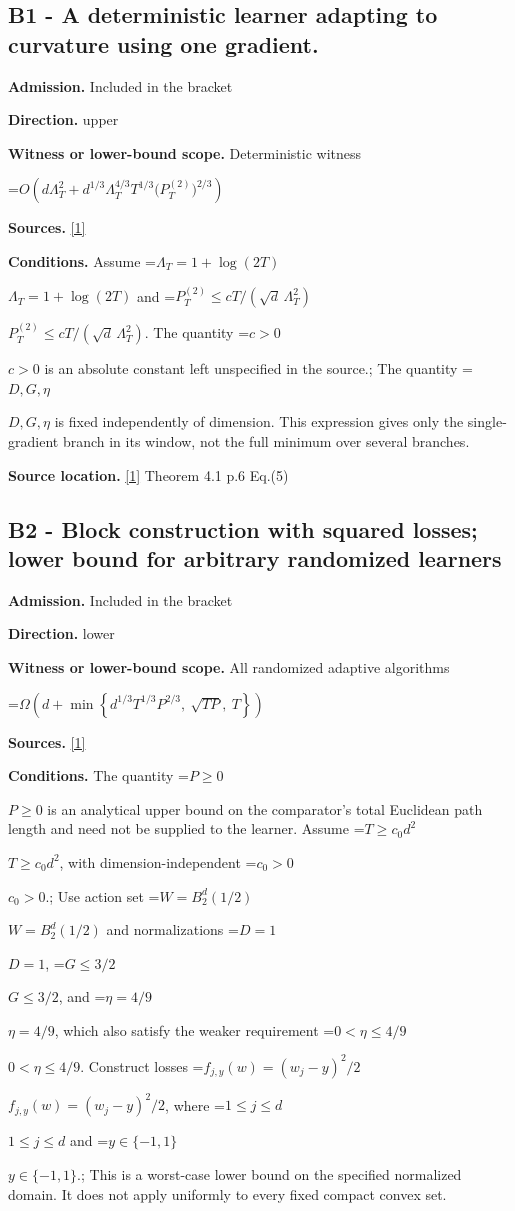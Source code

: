 \documentclass[10pt,a4paper]{article}
\newcommand{\AtlasMath}[1]{\par\begingroup\centering\setbox0=\hbox{$\displaystyle #1$}\ifdim\wd0>1.4\linewidth\typeout{ATLAS WIDE FORMULA: \the\wd0}\fi\ifdim\wd0>\linewidth\resizebox{\linewidth}{!}{\box0}\else\box0\fi\par\endgroup}
\newcommand{\AtlasInlineMath}[1]{\begingroup\setbox0=\hbox{$#1$}\ifdim\wd0>.4\linewidth\endgroup\AtlasMath{#1}\else\endgroup$#1$\fi}
\begin{document}
\subsection{B1 - A deterministic learner adapting to curvature using one gradient.}
\textbf{Admission.} Included in the bracket

\textbf{Direction.} upper

\textbf{Witness or lower-bound scope.} Deterministic witness

\AtlasMath{O\!\left(d\Lambda_T^2+d^{1/3}\Lambda_T^{4/3}T^{1/3}\bigl(P_T^{(2)}\bigr)^{2/3}\right)}
\textbf{Sources.} \href{https://arxiv.org/pdf/2610.20187v1}{[1]}

\textbf{Conditions.} Assume \AtlasInlineMath{\Lambda_T=1+\log(2T)} and \AtlasInlineMath{P_T^{(2)}\le cT/(\sqrt d\,\Lambda_T^2)}. The quantity \AtlasInlineMath{c>0} is an absolute constant left unspecified in the source.; The quantity \AtlasInlineMath{D,G,\eta} is fixed independently of dimension. This expression gives only the single-gradient branch in its window, not the full minimum over several branches.

\textbf{Source location.} \href{https://arxiv.org/pdf/2610.20187v1}{[1]} Theorem 4.1 p.6 Eq.(5)

\subsection{B2 - Block construction with squared losses; lower bound for arbitrary randomized learners}
\textbf{Admission.} Included in the bracket

\textbf{Direction.} lower

\textbf{Witness or lower-bound scope.} All randomized adaptive algorithms

\AtlasMath{\Omega\!\left(d+\min\!\left\{d^{1/3}T^{1/3}P^{2/3},\ \sqrt{TP},\ T\right\}\right)}
\textbf{Sources.} \href{https://arxiv.org/pdf/2610.20187v1}{[1]}

\textbf{Conditions.} The quantity \AtlasInlineMath{P\ge0} is an analytical upper bound on the comparator's total Euclidean path length and need not be supplied to the learner. Assume \AtlasInlineMath{T\ge c_0d^2}, with dimension-independent \AtlasInlineMath{c_0>0}.; Use action set \AtlasInlineMath{W=B_2^d(1/2)} and normalizations \AtlasInlineMath{D=1}, \AtlasInlineMath{G\le3/2}, and \AtlasInlineMath{\eta=4/9}, which also satisfy the weaker requirement \AtlasInlineMath{0<\eta\le4/9}. Construct losses \AtlasInlineMath{f_{j,y}(w)=(w_j-y)^2/2}, where \AtlasInlineMath{1\le j\le d} and \AtlasInlineMath{y\in\{-1,1\}}.; This is a worst-case lower bound on the specified normalized domain. It does not apply uniformly to every fixed compact convex set.
\end{document}
